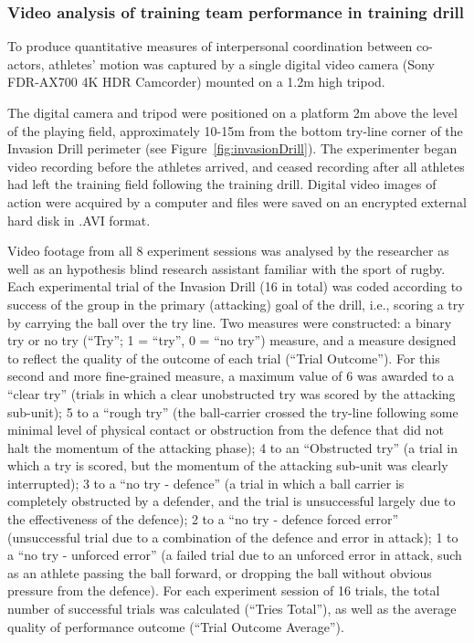 \begin{CJK}{UTF8}{gbsn}
\subsubsection{Video analysis of training team performance in training drill\label{sec:videoAnalysis}}
To produce quantitative measures of interpersonal coordination between co-actors, athletes' motion was captured by a single digital video camera (Sony FDR-AX700 4K HDR Camcorder) mounted on a 1.2m high tripod.

The digital camera and tripod were positioned on a platform 2m above the level of the playing field, approximately 10-15m from the bottom try-line corner of the Invasion Drill perimeter (see Figure~\ref{fig:invasionDrill}). The experimenter began video recording before the athletes arrived, and ceased recording after all athletes had left the training field following the training drill. Digital video images of action were acquired by a computer and files were saved on an encrypted external hard disk in .AVI format.


Video footage from all 8 experiment sessions was analysed by the researcher as well as an hypothesis blind research assistant familiar with the sport of rugby.  Each experimental trial of the Invasion Drill (16 in total) was coded according to success of the group in the primary (attacking) goal of the drill, i.e., scoring a try by carrying the ball over the try line.  Two measures were constructed: a binary try or no try (``Try''; 1 = ``try'', 0 = ``no try'') measure, and a measure designed to reflect the quality of the outcome of each trial (``Trial Outcome''). For this second and more fine-grained measure, a maximum value of 6 was awarded to a ``clear try'' (trials in which a clear unobstructed try was scored by the attacking sub-unit); 5 to a ``rough try'' (the ball-carrier crossed the try-line following some minimal level of physical contact or obstruction from the defence that did not halt the momentum of the attacking phase); 4 to an ``Obstructed try'' (a trial in which a try is scored, but the momentum of the attacking sub-unit was clearly interrupted); 3 to a ``no try - defence'' (a trial in which a ball carrier is completely obstructed by a defender, and the trial is unsuccessful largely due to the effectiveness of the defence); 2 to a ``no try - defence forced error'' (unsuccessful trial due to a combination of the defence and error in attack); 1 to a ``no try - unforced error'' (a failed trial due to an unforced error in attack, such as an athlete passing the ball forward, or dropping the ball without obvious pressure from the defence).  For each experiment session of 16 trials, the total number of successful trials was calculated (``Tries Total''), as well as the average quality of performance outcome (``Trial Outcome Average'').


\end{CJK}
